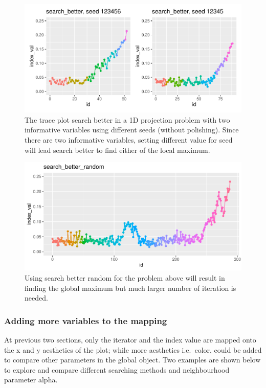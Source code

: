 \documentclass[12pt]{article}
\begin{document}
\begin{figure}
\centering
\includegraphics{paper_files/figure-latex/1d-2var-different-seeds-1.pdf}
\caption{The trace plot search better in a 1D projection problem with
two informative variables using different seeds (without polishing).
Since there are two informative variables, setting different value for
seed will lead search better to find either of the local maximum.}
\end{figure}

\begin{figure}
\centering
\includegraphics{paper_files/figure-latex/1d-2var-better-random-1.pdf}
\caption{Using search better random for the problem above will result in
finding the global maximum but much larger number of iteration is
needed.}
\end{figure}

\hypertarget{adding-more-variables-to-the-mapping}{%
\subsubsection{Adding more variables to the
mapping}\label{adding-more-variables-to-the-mapping}}

At previous two sections, only the iterator and the index value are
mapped onto the x and y aesthetics of the plot; while more aesthetics
i.e.~color, could be added to compare other parameters in the global
object. Two examples are shown below to explore and compare different
searching methods and neighbourhood parameter alpha.
\end{document}
